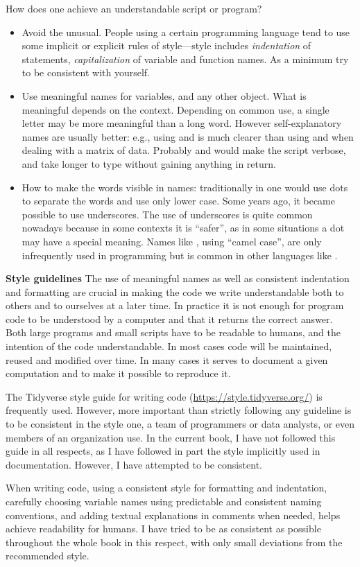 How does one achieve an understandable script or program?
\begin{itemize}
  \item Avoid the unusual. People using a certain programming language tend to use some implicit or explicit rules of style---style includes \textit{indentation} of statements, \textit{capitalization} of variable and function names. As a minimum try to be consistent with yourself.
  \item Use meaningful names for variables, and any other object. What is meaningful depends on the context. Depending on common use, a single letter may be more meaningful than a long word. However self-explanatory names are usually better: e.g.,  using  and  is much clearer than using  and  when dealing with a matrix of data. Probably  and  would make the script verbose, and take longer to type without gaining anything in return.
  \item How to make the words visible in names: traditionally in \Rlang one would use dots to separate the words and use only lower case. Some years ago, it became possible to use underscores. The use of underscores is quite common nowadays because in some contexts it is ``safer'', as in some situations a dot may have a special meaning. Names like , using ``camel case'', are only infrequently used in \Rlang programming but is common in other languages like \pascallang.
\end{itemize}

\begin{infobox}
\textbf{Style guidelines} The use of meaningful names as well as consistent indentation and formatting are crucial in making the code we write understandable both to others and to ourselves at a later time. In practice it is not enough for program code to be understood by a computer and that it returns the correct answer. Both large programs and small scripts have to be readable to humans, and the intention of the code understandable. In most cases \Rlang code will be maintained, reused and modified over time. In many cases it serves to document a given computation and to make it possible to reproduce it.

The Tidyverse style guide for writing \Rlang code (\url{https://style.tidyverse.org/}) is frequently used. However, more important than strictly following any guideline is to be consistent in the style one, a team of programmers or data analysts, or even members of an organization use. In the current book, I have not followed this guide in all respects, as I have followed in part the style implicitly used in \Rlang documentation. However, I have attempted to be consistent.

When writing code, using a consistent style for formatting and indentation, carefully choosing variable names using predictable and consistent naming conventions, and adding textual explanations in comments when needed, helps achieve readability for humans. I have tried to be as consistent as possible throughout the whole book in this respect, with only small deviations from the recommended style.
\end{infobox}

